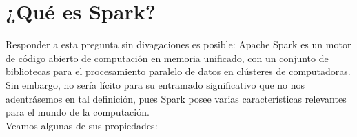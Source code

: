 \chapter{¿Qué es Spark?}
\fancyhead[RE,LO]{\leftmark}
\fancyhead[LE,RO]{\rightmark}
\fancyfoot[CE,CO]{\thepage}
Responder a esta pregunta sin divagaciones es posible: Apache Spark es un motor de código abierto de computación en memoria unificado, con un conjunto de bibliotecas para el procesamiento paralelo de datos en clústeres de computadoras. Sin embargo, no sería lícito para su entramado significativo que no nos adentrásemos en tal definición, pues Spark  posee varias características  relevantes para el mundo de la computación.\\

Veamos algunas de sus propiedades:\\

